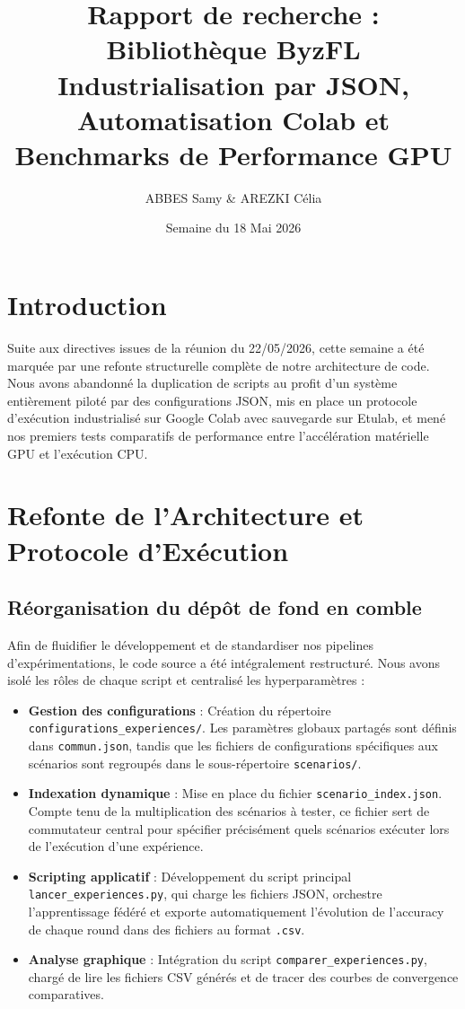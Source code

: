 \documentclass[11pt, a4paper]{article}
\title{\textbf{Rapport de recherche : Bibliothèque ByzFL} \\ \large Industrialisation par JSON, Automatisation Colab et Benchmarks de Performance GPU}
\author{ABBES Samy \& AREZKI Célia}
\date{Semaine du 18 Mai 2026}
\begin{document}
\maketitle

\section{Introduction}
Suite aux directives issues de la réunion du 22/05/2026, cette semaine a été marquée par une refonte structurelle complète de notre architecture de code. Nous avons abandonné la duplication de scripts au profit d'un système entièrement piloté par des configurations JSON, mis en place un protocole d'exécution industrialisé sur Google Colab avec sauvegarde sur Etulab, et mené nos premiers tests comparatifs de performance entre l'accélération matérielle GPU et l'exécution CPU.

\section{Refonte de l'Architecture et Protocole d'Exécution}

\subsection{Réorganisation du dépôt de fond en comble}
Afin de fluidifier le développement et de standardiser nos pipelines d'expérimentations, le code source a été intégralement restructuré. Nous avons isolé les rôles de chaque script et centralisé les hyperparamètres :
\begin{itemize}
    \item \textbf{Gestion des configurations} : Création du répertoire \texttt{configurations\_experiences/}. Les paramètres globaux partagés sont définis dans \texttt{commun.json}, tandis que les fichiers de configurations spécifiques aux scénarios sont regroupés dans le sous-répertoire \texttt{scenarios/}. 
    \item \textbf{Indexation dynamique} : Mise en place du fichier \texttt{scenario\_index.json}. Compte tenu de la multiplication des scénarios à tester, ce fichier sert de commutateur central pour spécifier précisément quels scénarios exécuter lors de l'exécution d'une expérience.
    \item \textbf{Scripting applicatif} : Développement du script principal \texttt{lancer\_experiences.py}, qui charge les fichiers JSON, orchestre l'apprentissage fédéré et exporte automatiquement l'évolution de l'accuracy de chaque round dans des fichiers au format \texttt{.csv}.
    \item \textbf{Analyse graphique} : Intégration du script \texttt{comparer\_experiences.py}, chargé de lire les fichiers CSV générés et de tracer des courbes de convergence comparatives.
\end{itemize}
\end{document}
